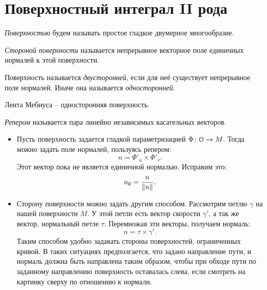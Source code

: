 \section{Поверхностный интеграл II рода}

\begin{definition}
    \textit{Поверхностью} будем называть простое гладкое двумерное многообразие.
\end{definition}

\begin{definition}
    \textit{Стороной поверхности} называется непрерывное векторное поле единичных нормалей
    к этой поверхности.
\end{definition}

\begin{definition}
    Поверхность называется \textit{двусторонней}, если для неё существует непрерывное
    поле нормалей. Иначе она называется \textit{односторонней}.
\end{definition}

\begin{example}
    Лента Мебиуса -- односторонняя поверхность.
\end{example}

\begin{definition}
    \textit{Репером} называется пара линейно независимых касательных векторов.
\end{definition}

\begin{example}
    \enewline
    \begin{itemize}
        \item Пусть поверхность задается гладкой параметризацией $\Phi \colon \mathcal{O} \to M$.
            Тогда можно задать поле нормалей, пользуясь репером:
            \[
                n = \Phi'_u \times \Phi'_v
            .\]
            Этот вектор пока не является единичной нормалью. Исправим это:
            \[
                n_0 = \frac{n}{\left\lVert n\right\rVert}
            .\]
        \item Сторону поверхности можно задать другим способом. Рассмотрим петлю $\gamma$
            на нашей поверхности $M$. У этой петли есть вектор скорости $\gamma'$, а так
            же вектор, нормальный петле $\tau$. Перемножая эти векторы, получаем нормаль:
            \[
                n = \tau \times \gamma'
            .\]
            Таким способом удобно задавать стороны поверхностей, ограниченных кривой.
            В таких ситуациях предполгается, что задано направление пути, и нормаль должна быть
            направлена таким образом, чтобы при обходе пути по заданному направлению 
            поверхность оставалась слева, если смотреть на картинку сверху по отношению
            к нормали.
    \end{itemize}       
\end{example}

